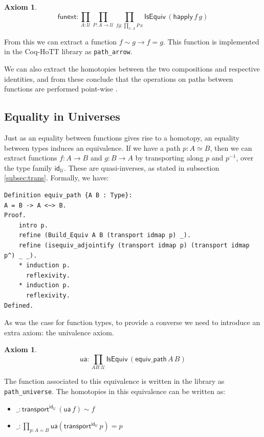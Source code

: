 \documentclass[12 pt]{amsart}
\newtheorem{axiom}[subsubsection]{Axiom}
\theoremstyle{definition}
\theoremstyle{remark}
\newcommand{\Type}{\mathcal{U}}
\newcommand{\trans}{\mathsf{transport}}
\newcommand{\ua}{{\mathsf{ua}}}
\newcommand{\happly}{{\mathsf{happly}}}
\newcommand{\idtoeqv}{{\mathsf{equiv\_path}}}
\newcommand{\id}{{\mathsf{id}}}
\newcommand{\IsEquiv}{\mathsf{IsEquiv}}
\newcommand{\funext}{\mathsf{funext}}
\begin{document}
\begin{axiom}
\[\funext : \prod_{A : \Type} \prod_{P : A \to \Type} \prod_{f g : \prod_{x : A} P\, x} \IsEquiv\, (\happly\, f\, g)\]
\end{axiom}

From this we can extract a function $f \sim g \to f = g$. This function is implemented in the Coq-HoTT library as \texttt{path\_arrow}.

We can also extract the homotopies between the two compositions and respective identities, and from these conclude that the operations on paths between functions are performed point-wise \cite[Section 2.9]{hottbook}.


\subsection{Equality in Universes}

Just as an equality between functions gives rise to a homotopy, an equality between types induces an equivalence. If we have a path $p : A \simeq B$, then we can extract functions $f : A \to B$ and $g : B \to A$ by transporting along $p$ and $p^{-1}$, over the type family $\id_\Type$. 
These are quasi-inverses, as stated in subsection \ref{subsec:trans}. Formally, we have: 

\begin{lstlisting}
Definition equiv_path {A B : Type}:
A = B -> A <~> B.
Proof.
    intro p.
    refine (Build_Equiv A B (transport idmap p) _).
    refine (isequiv_adjointify (transport idmap p) (transport idmap p^) _ _).
    * induction p.
      reflexivity.
    * induction p.
      reflexivity.
Defined.
\end{lstlisting}


As was the case for function types, to provide a converse we need to introduce an extra axiom: the univalence axiom.

\begin{axiom}
\[\ua : \prod_{A B : \Type} \IsEquiv \,( \idtoeqv\,A\,B)\]
\end{axiom}

The function associated to this equivalence is written in the library as \texttt{path\_universe}. The homotopies in this equivalence can be written as:

\begin{itemize}
\item$\_ : \trans^{\id_\Type} \, (\ua\, f) \sim f$
\item $\_ : \prod_{p : A = B} \ua (\trans^{\id_\Type}\, p) = p$
\end{itemize}
\end{document}
